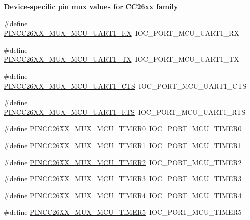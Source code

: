 \begin{Indent}{\bf Device-\/specific pin mux values for C\+C26xx family}
\begin{DoxyCompactItemize}
\item 
\#define \hyperlink{_p_i_n_c_c26_x_x_8h_a6248f1734f57a34106adcd1f1433da80}{P\+I\+N\+C\+C26\+X\+X\+\_\+\+M\+U\+X\+\_\+\+M\+C\+U\+\_\+\+U\+A\+R\+T1\+\_\+\+R\+X}~I\+O\+C\+\_\+\+P\+O\+R\+T\+\_\+\+M\+C\+U\+\_\+\+U\+A\+R\+T1\+\_\+\+R\+X
\item 
\#define \hyperlink{_p_i_n_c_c26_x_x_8h_a86f90a7c527db111500f481c32503c0e}{P\+I\+N\+C\+C26\+X\+X\+\_\+\+M\+U\+X\+\_\+\+M\+C\+U\+\_\+\+U\+A\+R\+T1\+\_\+\+T\+X}~I\+O\+C\+\_\+\+P\+O\+R\+T\+\_\+\+M\+C\+U\+\_\+\+U\+A\+R\+T1\+\_\+\+T\+X
\item 
\#define \hyperlink{_p_i_n_c_c26_x_x_8h_a7e579ca0aee2428813b15c97ba23d28b}{P\+I\+N\+C\+C26\+X\+X\+\_\+\+M\+U\+X\+\_\+\+M\+C\+U\+\_\+\+U\+A\+R\+T1\+\_\+\+C\+T\+S}~I\+O\+C\+\_\+\+P\+O\+R\+T\+\_\+\+M\+C\+U\+\_\+\+U\+A\+R\+T1\+\_\+\+C\+T\+S
\item 
\#define \hyperlink{_p_i_n_c_c26_x_x_8h_a19de716646ff8365a45a1111c5d41979}{P\+I\+N\+C\+C26\+X\+X\+\_\+\+M\+U\+X\+\_\+\+M\+C\+U\+\_\+\+U\+A\+R\+T1\+\_\+\+R\+T\+S}~I\+O\+C\+\_\+\+P\+O\+R\+T\+\_\+\+M\+C\+U\+\_\+\+U\+A\+R\+T1\+\_\+\+R\+T\+S
\item 
\#define \hyperlink{_p_i_n_c_c26_x_x_8h_ab6adbeb3876713207934393f6e3ea98b}{P\+I\+N\+C\+C26\+X\+X\+\_\+\+M\+U\+X\+\_\+\+M\+C\+U\+\_\+\+T\+I\+M\+E\+R0}~I\+O\+C\+\_\+\+P\+O\+R\+T\+\_\+\+M\+C\+U\+\_\+\+T\+I\+M\+E\+R0
\item 
\#define \hyperlink{_p_i_n_c_c26_x_x_8h_a3920a9c6a9d4e7111672d9db47dd2f0f}{P\+I\+N\+C\+C26\+X\+X\+\_\+\+M\+U\+X\+\_\+\+M\+C\+U\+\_\+\+T\+I\+M\+E\+R1}~I\+O\+C\+\_\+\+P\+O\+R\+T\+\_\+\+M\+C\+U\+\_\+\+T\+I\+M\+E\+R1
\item 
\#define \hyperlink{_p_i_n_c_c26_x_x_8h_a0f58eb941ff925a8b03cd2bb482471eb}{P\+I\+N\+C\+C26\+X\+X\+\_\+\+M\+U\+X\+\_\+\+M\+C\+U\+\_\+\+T\+I\+M\+E\+R2}~I\+O\+C\+\_\+\+P\+O\+R\+T\+\_\+\+M\+C\+U\+\_\+\+T\+I\+M\+E\+R2
\item 
\#define \hyperlink{_p_i_n_c_c26_x_x_8h_aae7f9981ad149939a03138af56f6f65f}{P\+I\+N\+C\+C26\+X\+X\+\_\+\+M\+U\+X\+\_\+\+M\+C\+U\+\_\+\+T\+I\+M\+E\+R3}~I\+O\+C\+\_\+\+P\+O\+R\+T\+\_\+\+M\+C\+U\+\_\+\+T\+I\+M\+E\+R3
\item 
\#define \hyperlink{_p_i_n_c_c26_x_x_8h_abe7dc70b7e11903c65cd712f0d7f9c06}{P\+I\+N\+C\+C26\+X\+X\+\_\+\+M\+U\+X\+\_\+\+M\+C\+U\+\_\+\+T\+I\+M\+E\+R4}~I\+O\+C\+\_\+\+P\+O\+R\+T\+\_\+\+M\+C\+U\+\_\+\+T\+I\+M\+E\+R4
\item 
\#define \hyperlink{_p_i_n_c_c26_x_x_8h_a1dfa83441369f987a042dd2e5b9b5bca}{P\+I\+N\+C\+C26\+X\+X\+\_\+\+M\+U\+X\+\_\+\+M\+C\+U\+\_\+\+T\+I\+M\+E\+R5}~I\+O\+C\+\_\+\+P\+O\+R\+T\+\_\+\+M\+C\+U\+\_\+\+T\+I\+M\+E\+R5

\end{DoxyCompactItemize}
\end{Indent}
